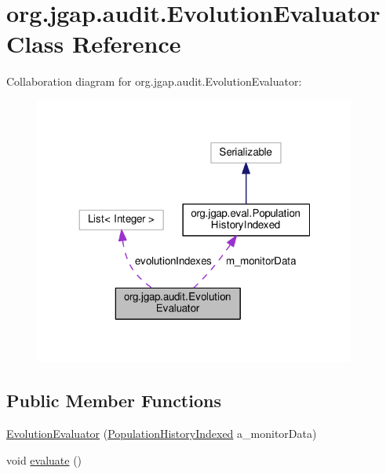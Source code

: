 \hypertarget{classorg_1_1jgap_1_1audit_1_1_evolution_evaluator}{\section{org.\-jgap.\-audit.\-Evolution\-Evaluator Class Reference}
\label{classorg_1_1jgap_1_1audit_1_1_evolution_evaluator}
}


Collaboration diagram for org.\-jgap.\-audit.\-Evolution\-Evaluator\-:
\nopagebreak
\begin{figure}[H]
\begin{center}
\leavevmode
\includegraphics[width=299pt]{classorg_1_1jgap_1_1audit_1_1_evolution_evaluator__coll__graph}
\end{center}
\end{figure}
\subsection*{Public Member Functions}
\begin{DoxyCompactItemize}
\item 
\hyperlink{classorg_1_1jgap_1_1audit_1_1_evolution_evaluator_a1dc266bf9517cbaf2dd766cc452c8096}{Evolution\-Evaluator} (\hyperlink{classorg_1_1jgap_1_1eval_1_1_population_history_indexed}{Population\-History\-Indexed} a\-\_\-monitor\-Data)
\item 
void \hyperlink{classorg_1_1jgap_1_1audit_1_1_evolution_evaluator_a411341e5eb1abbec8e0995d8fb49727a}{evaluate} ()
\end{DoxyCompactItemize}
